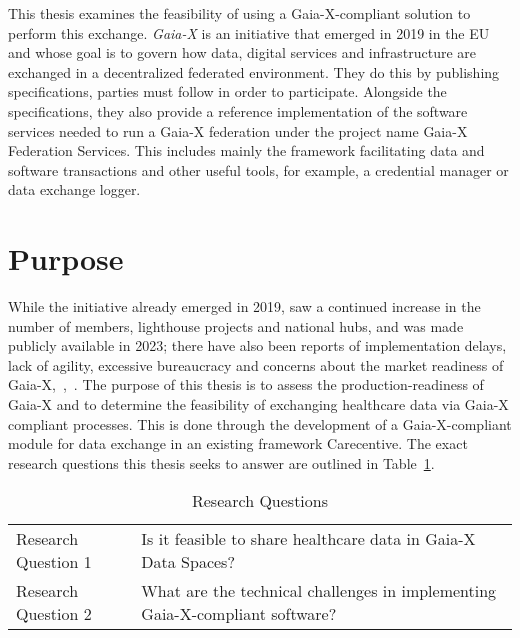 This thesis examines the feasibility of using a Gaia-X-compliant solution to perform this exchange.
\textit{Gaia-X}\cite{gaiax} is an initiative that emerged in 2019 in the EU and whose goal is to govern how data, digital services and infrastructure are exchanged in a decentralized federated environment.
They do this by publishing specifications, parties must follow in order to participate.
Alongside the specifications, they also provide a reference implementation of the software services needed to run a Gaia-X federation under the project name Gaia-X Federation Services\cite{gxfs}.
This includes mainly the framework facilitating data and software transactions and other useful tools, for example, a credential manager or data exchange logger.

\section{Purpose}\label{sec:purpose}

While the initiative already emerged in 2019, saw a continued increase in the number of members, lighthouse projects and national hubs, and was made publicly available in 2023; there have also been reports of implementation delays, lack of agility, excessive bureaucracy and concerns about the market readiness of Gaia-X\cite{say_gaia-x_2024},~\cite{noauthor_inside_2021},~\cite{eichberger_why_2021}.
The purpose of this thesis is to assess the production-readiness of Gaia-X and to determine the feasibility of exchanging healthcare data via Gaia-X compliant processes.
This is done through the development of a Gaia-X-compliant module for data exchange in an existing framework Carecentive\cite{noauthor_carecentivenet_nodate}.
The exact research questions this thesis seeks to answer are outlined in Table~\ref{tab:research-questions}.

\begin{table}
    \centering
    {\renewcommand{\arraystretch}{1.7}
        \begin{tabular}{ p{4cm}|p{11cm} }
            Research Question 1 & Is it feasible to share healthcare data in Gaia-X Data Spaces?\\
            \hhline{--}
            Research Question 2 & What are the technical challenges in implementing Gaia-X-compliant software?
        \end{tabular}
    }
    \caption{Research Questions}
    \label{tab:research-questions}
\end{table}

